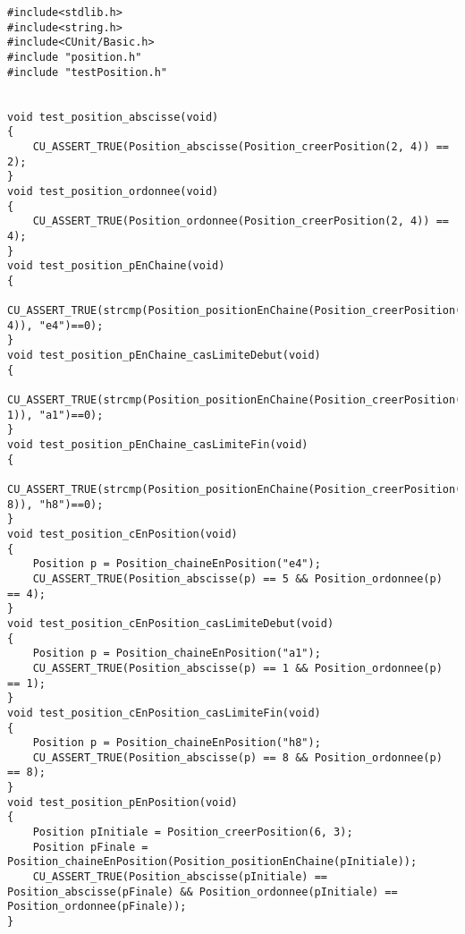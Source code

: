  
\begin{lstlisting}
#include<stdlib.h>
#include<string.h>
#include<CUnit/Basic.h>
#include "position.h"
#include "testPosition.h"


void test_position_abscisse(void)
{
	CU_ASSERT_TRUE(Position_abscisse(Position_creerPosition(2, 4)) == 2);
}
void test_position_ordonnee(void)
{
	CU_ASSERT_TRUE(Position_ordonnee(Position_creerPosition(2, 4)) == 4);
}
void test_position_pEnChaine(void)
{
	CU_ASSERT_TRUE(strcmp(Position_positionEnChaine(Position_creerPosition(5, 4)), "e4")==0);
}
void test_position_pEnChaine_casLimiteDebut(void)
{
	CU_ASSERT_TRUE(strcmp(Position_positionEnChaine(Position_creerPosition(1, 1)), "a1")==0);
}
void test_position_pEnChaine_casLimiteFin(void)
{
	CU_ASSERT_TRUE(strcmp(Position_positionEnChaine(Position_creerPosition(8, 8)), "h8")==0);
}
void test_position_cEnPosition(void)
{
	Position p = Position_chaineEnPosition("e4");
	CU_ASSERT_TRUE(Position_abscisse(p) == 5 && Position_ordonnee(p) == 4);
}
void test_position_cEnPosition_casLimiteDebut(void)
{
	Position p = Position_chaineEnPosition("a1");
	CU_ASSERT_TRUE(Position_abscisse(p) == 1 && Position_ordonnee(p) == 1);
}
void test_position_cEnPosition_casLimiteFin(void)
{
	Position p = Position_chaineEnPosition("h8");
	CU_ASSERT_TRUE(Position_abscisse(p) == 8 && Position_ordonnee(p) == 8);
}
void test_position_pEnPosition(void)
{
	Position pInitiale = Position_creerPosition(6, 3);
	Position pFinale = Position_chaineEnPosition(Position_positionEnChaine(pInitiale));
	CU_ASSERT_TRUE(Position_abscisse(pInitiale) == Position_abscisse(pFinale) && Position_ordonnee(pInitiale) == Position_ordonnee(pFinale));
}
\end{lstlisting}
 
